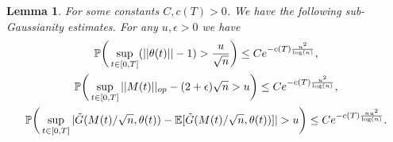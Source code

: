 \documentclass{amsart}
\newtheorem{lm}[thm]{Lemma}
\numberwithin{equation}{section}
\newcommand{\E}{\mathbb{E}}
\newcommand{\pr}{\mathbb{P}}
\begin{document}
\begin{lm}\label{Supremum Lemma}
    For some constants $C,c(T)>0$. We have the following sub-Gaussianity estimates. For any $u,\epsilon>0$ we have
    \begin{gather}\label{Norm Supremum}
        \pr\bigg(\sup_{t \in [0,T]}(||\theta(t)||-1)>\frac{u}{\sqrt{n}}\bigg) \leq  Ce^{-c(T)\frac{u^2}{\log(n)}},\\
    \label{Operator Norm Supremum} \pr\bigg(\sup_{t \in [0,T]}||M(t)||_{op}-(2+\epsilon)\sqrt{n}>u\bigg) \leq Ce^{-c(T)\frac{u^2}{\log(n)}},\\ \label{Tilde G Concentration}
    \pr\bigg(\sup_{t\in [0,T]}|\Tilde{G}(M(t)/\sqrt{n},\theta(t))-\E[\Tilde{G}(M(t)/\sqrt{n},\theta(t))]|>u\bigg) \leq Ce^{-c(T)\frac{nu^2}{\log(n)}}.
    \end{gather}
\end{lm}
\end{document}
